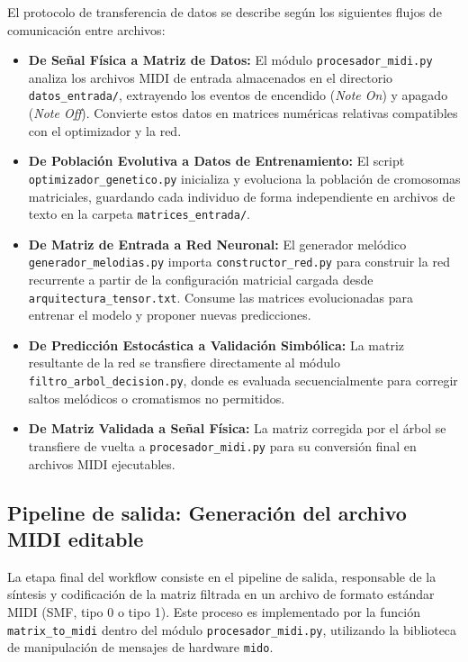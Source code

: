 El protocolo de transferencia de datos se describe según los siguientes flujos de comunicación entre archivos:
\begin{itemize}
    \item \textbf{De Señal Física a Matriz de Datos:} El módulo \texttt{procesador\_midi.py} analiza los archivos MIDI de entrada almacenados en el directorio \texttt{datos\_entrada/}, extrayendo los eventos de encendido (\textit{Note On}) y apagado (\textit{Note Off}). Convierte estos datos en matrices numéricas relativas compatibles con el optimizador y la red.
    \item \textbf{De Población Evolutiva a Datos de Entrenamiento:} El script \texttt{optimizador\_genetico.py} inicializa y evoluciona la población de cromosomas matriciales, guardando cada individuo de forma independiente en archivos de texto en la carpeta \texttt{matrices\_entrada/}.
    \item \textbf{De Matriz de Entrada a Red Neuronal:} El generador melódico \texttt{generador\_melodias.py} importa \texttt{constructor\_red.py} para construir la red recurrente a partir de la configuración matricial cargada desde \texttt{arquitectura\_tensor.txt}. Consume las matrices evolucionadas para entrenar el modelo y proponer nuevas predicciones.
    \item \textbf{De Predicción Estocástica a Validación Simbólica:} La matriz resultante de la red se transfiere directamente al módulo \texttt{filtro\_arbol\_decision.py}, donde es evaluada secuencialmente para corregir saltos melódicos o cromatismos no permitidos.
    \item \textbf{De Matriz Validada a Señal Física:} La matriz corregida por el árbol se transfiere de vuelta a \texttt{procesador\_midi.py} para su conversión final en archivos MIDI ejecutables.
\end{itemize}

\subsection{Pipeline de salida: Generación del archivo MIDI editable}

La etapa final del workflow consiste en el pipeline de salida, responsable de la síntesis y codificación de la matriz filtrada en un archivo de formato estándar MIDI (SMF, tipo 0 o tipo 1). Este proceso es implementado por la función \texttt{matrix\_to\_midi} dentro del módulo \texttt{procesador\_midi.py}, utilizando la biblioteca de manipulación de mensajes de hardware \texttt{mido}.

